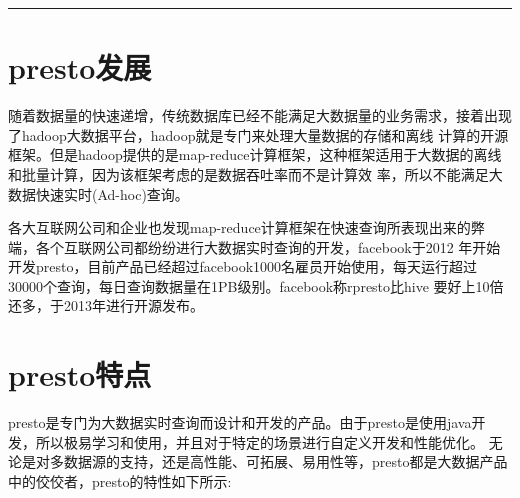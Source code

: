 \documentclass[letterpaper,10pt,english]{sphinxmanual}
\begin{document}
\bigskip\hrule\bigskip



\section{presto发展}
\label{\detokenize{overview/develop:presto}}\label{\detokenize{overview/develop::doc}}
随着数据量的快速递增，传统数据库已经不能满足大数据量的业务需求，接着出现了hadoop大数据平台，hadoop就是专门来处理大量数据的存储和离线
计算的开源框架。但是hadoop提供的是map-reduce计算框架，这种框架适用于大数据的离线和批量计算，因为该框架考虑的是数据吞吐率而不是计算效
率，所以不能满足大数据快速实时(Ad-hoc)查询。

各大互联网公司和企业也发现map-reduce计算框架在快速查询所表现出来的弊端，各个互联网公司都纷纷进行大数据实时查询的开发，facebook于2012
年开始开发presto，目前产品已经超过facebook1000名雇员开始使用，每天运行超过30000个查询，每日查询数据量在1PB级别。facebook称rpresto比hive
要好上10倍还多，于2013年进行开源发布。


\section{presto特点}
\label{\detokenize{overview/feature:presto}}\label{\detokenize{overview/feature::doc}}
presto是专门为大数据实时查询而设计和开发的产品。由于presto是使用java开发，所以极易学习和使用，并且对于特定的场景进行自定义开发和性能优化。
无论是对多数据源的支持，还是高性能、可拓展、易用性等，presto都是大数据产品中的佼佼者，presto的特性如下所示:
\end{document}
